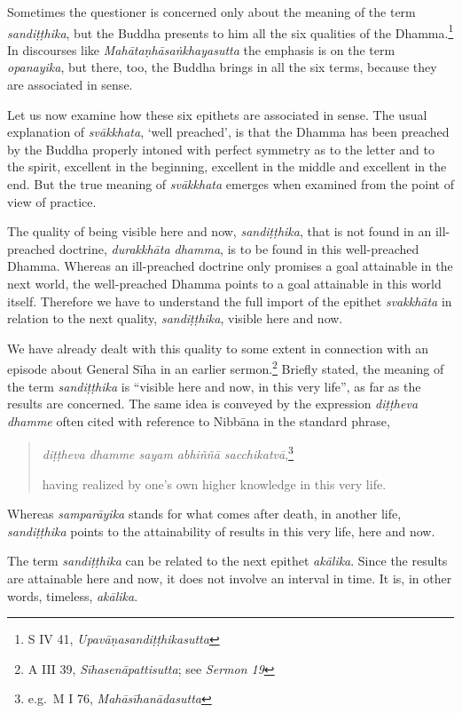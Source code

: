 Sometimes the questioner is concerned only about the meaning of the term \emph{sandiṭṭhika}, but the Buddha presents to him all the six qualities of the Dhamma.\footnote{S IV 41, \emph{Upavāṇasandiṭṭhikasutta}} In discourses like \emph{Mahātaṇhāsaṅkhayasutta} the emphasis is on the term \emph{opanayika}, but there, too, the Buddha brings in all the six terms, because they are associated in sense.

Let us now examine how these six epithets are associated in sense. The usual explanation of \emph{svākkhata}, `well preached', is that the Dhamma has been preached by the Buddha properly intoned with perfect symmetry as to the letter and to the spirit, excellent in the beginning, excellent in the middle and excellent in the end. But the true meaning of \emph{svākkhata} emerges when examined from the point of view of practice.

The quality of being visible here and now, \emph{sandiṭṭhika}, that is not found in an ill-preached doctrine, \emph{durakkhāta dhamma}, is to be found in this well-preached Dhamma. Whereas an ill-preached doctrine only promises a goal attainable in the next world, the well-preached Dhamma points to a goal attainable in this world itself. Therefore we have to understand the full import of the epithet \emph{svakkhāta} in relation to the next quality, \emph{sandiṭṭhika}, visible here and now.

We have already dealt with this quality to some extent in connection with an episode about General Sīha in an earlier sermon.\footnote{A III 39, \emph{Sīhasenāpattisutta}; see \emph{Sermon 19}} Briefly stated, the meaning of the term \emph{sandiṭṭhika} is ``visible here and now, in this very life'', as far as the results are concerned. The same idea is conveyed by the expression \emph{diṭṭheva dhamme} often cited with reference to Nibbāna in the standard phrase,

\begin{quote}
\emph{diṭṭheva dhamme sayam abhiññā sacchikatvā},\footnote{e.g.~M I 76, \emph{Mahāsīhanādasutta}}

having realized by one's own higher knowledge in this very life.
\end{quote}

Whereas \emph{samparāyika} stands for what comes after death, in another life, \emph{sandiṭṭhika} points to the attainability of results in this very life, here and now.

The term \emph{sandiṭṭhika} can be related to the next epithet \emph{akālika}. Since the results are attainable here and now, it does not involve an interval in time. It is, in other words, timeless, \emph{akālika}.

